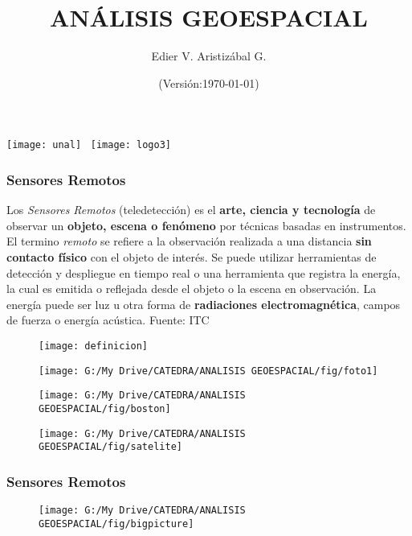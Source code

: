 \documentclass[14pt]{beamer}
\title[Sensores Remotos]{ANÁLISIS GEOESPACIAL}
\author[Edier Aristizábal]{Edier V. Aristizábal G.}
\institute{\emph{evaristizabalg@unal.edu.co}}
\date{(Versión:\today)}
\begin{document}
\begin{frame}
\titlepage
\centering
	\texttt{[image: unal]}\hspace*{4.75cm}~%
   	\texttt{[image: logo3]} 
\end{frame}
\begin{frame}
\frametitle{Sensores Remotos}
\scriptsize {Los \emph{Sensores Remotos} (teledetección) es el \textbf{arte, ciencia y tecnología} de observar un \textbf{objeto, escena o fenómeno} por técnicas basadas en instrumentos. El termino \emph{remoto} se refiere a la observación realizada a una distancia \textbf{sin contacto físico} con el objeto de interés. Se puede utilizar herramientas de detección y despliegue en tiempo real o una herramienta que registra la energía, la cual es emitida o reflejada desde el objeto o la escena en observación. La energía puede ser luz u otra forma de \textbf{radiaciones electromagnética}, campos de fuerza o energía acústica.}
\tiny{Fuente: ITC} 
  \begin{figure}
    \centering
    \texttt{[image: definicion]}
   \end{figure}
\end{frame}
\begin{frame}
  \begin{figure}
    \centering
    \texttt{[image: G:/My Drive/CATEDRA/ANALISIS GEOESPACIAL/fig/foto1]}
\tiny{}
 \end{figure}
\end{frame}
\begin{frame}
  \begin{figure}
    \centering
    \texttt{[image: G:/My Drive/CATEDRA/ANALISIS GEOESPACIAL/fig/boston]}
\tiny{}
 \end{figure}
\end{frame}
\begin{frame}
  \begin{figure}
    \centering
    \texttt{[image: G:/My Drive/CATEDRA/ANALISIS GEOESPACIAL/fig/satelite]}
\tiny{}
 \end{figure}
\end{frame}
\begin{frame}
\frametitle{Sensores Remotos}
  \begin{figure}
    \centering
    \texttt{[image: G:/My Drive/CATEDRA/ANALISIS GEOESPACIAL/fig/bigpicture]}
\tiny{}
 \end{figure}
\end{frame}
\end{document}
